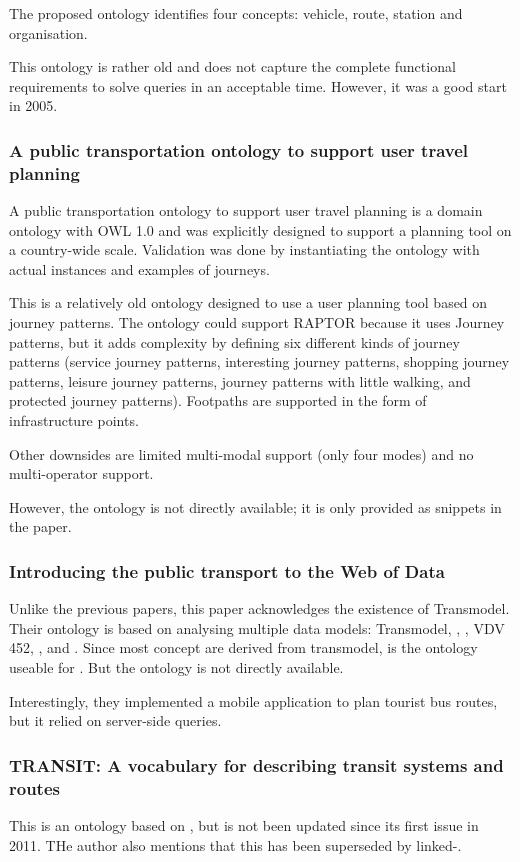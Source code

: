 The proposed ontology identifies four concepts: vehicle, route, station and organisation. 

This ontology is rather old and does not capture the complete functional requirements to solve queries in an acceptable time. However, it was a good start in 2005.
\subsubsection{A public transportation ontology to support user travel planning}
 A public transportation ontology to support user travel planning \cite{houda_public_2010} is a domain ontology with OWL 1.0 and was explicitly designed to support a planning tool on a country-wide scale. Validation was done by instantiating the ontology with actual instances and examples of journeys. 


This is a relatively old ontology designed to use a user planning tool based on journey patterns. The ontology could support RAPTOR because it uses Journey patterns, but it adds complexity by defining six different kinds of journey patterns (service journey patterns, interesting journey patterns, shopping journey patterns, leisure journey patterns, journey patterns with little walking, and protected journey patterns). Footpaths are supported in the form of infrastructure points.

Other downsides are limited multi-modal support (only four modes) and no multi-operator support.

However, the ontology is not directly available; it is only provided as snippets in the paper. 
\subsubsection{Introducing the public transport to the Web of Data}
Unlike the previous papers, this paper \cite{benatallah_introducing_2014} acknowledges the existence of Transmodel. Their ontology is based on analysing multiple data models: Transmodel, , , VDV 452, ,  and . Since most concept are derived from transmodel, is the ontology useable for . But the ontology is not directly available.

Interestingly, they implemented a mobile application to plan tourist bus routes, but it relied on server-side queries.
\subsubsection{TRANSIT: A vocabulary for describing transit systems and routes}
This is an ontology \cite{noauthor_transit_nodate} based on , but is not been updated since its first issue in 2011. THe author also mentions that this has been superseded by linked-.
